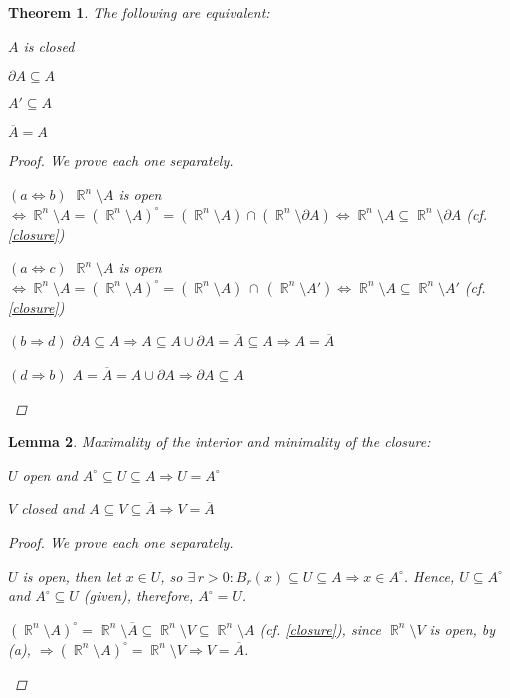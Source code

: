 \documentclass[12pt]{article}
\let\RA\Rightarrow
\let\LR\Leftrightarrow
\newcommand{\Exist}[1]{\exists\,{#1}:}
\DeclareMathOperator{\R}{\mathbb{R}}
\newcommand{\comp}[2][n]{\R^{#1}\setminus{#2}}
\newcommand{\cl}[1]{\overline{#1}}
\newtheorem{theorem}{Theorem}[subsection]
\newtheorem{lemma}[theorem]{Lemma}
\begin{document}
\begin{theorem}
  \label{eq_closed}
  The following are equivalent:
  \begin{compactenum}[(a)]
    \item $A$ is closed
    \item $\partial A\subseteq A$
    \item $A'\subseteq A$
    \item $\cl{A}=A$
  \end{compactenum}
  \begin{proof}
    We prove each one separately.
    \begin{compactitem}
      \item[$(a\LR b)$] $\comp{A}$ is open $\LR\comp{A}=(\comp{A})^\circ=(\comp{A})\cap(\comp{\partial A})\LR \comp{A}\subseteq\comp{\partial A}$ (cf. \ref{closure})
      \item[$(a\LR c)$] $\comp{A}$ is open $\LR\comp{A}=(\comp{A})^\circ=(\comp{A})\,\cap\,(\comp{A'})\LR \comp{A}\subseteq\comp{A'}$ (cf. \ref{closure})
      \item[$(b\RA d)$] $\partial A\subseteq A\RA A\subseteq  A\cup \partial A= \cl{A}\subseteq A \RA A=\cl{A}$ 
      \item[$(d\RA b)$] $A=\cl{A}=A\cup \partial A\RA \partial A \subseteq A$ 
    \end{compactitem}
  \end{proof}
\end{theorem}

\begin{lemma}
  Maximality of the interior and minimality of the closure:
  \begin{compactenum}[(a)]
    \item $U$ open and $A^\circ \subseteq U\subseteq A\RA U=A^\circ$
    \item $V$ closed and $A \subseteq V\subseteq \cl{A}\RA V=\cl{A}$
  \end{compactenum}
  \begin{proof}
    We prove each one separately.
    \begin{compactenum}[(a)]
      \item $U$ is open, then let $x\in U$, so $\Exist{r>0}B_r(x)\subseteq U\subseteq A\RA x\in A^\circ$. Hence, $U\subseteq A^\circ$ and $A^\circ \subseteq U$ (given), therefore, $A^\circ =U$.
      \item $(\comp{A})^\circ=\comp{\cl{A}}\subseteq \comp{V}\subseteq \comp{A}$ (cf. \ref{closure}), since $\comp{V}$ is open, by (a), $\RA (\comp{A})^\circ=\comp{V}\RA V=\cl{A}$.
    \end{compactenum}
  \end{proof}
\end{lemma}
\end{document}

